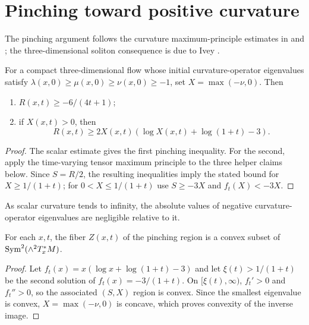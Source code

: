 \section{Pinching toward positive curvature}
The pinching argument follows the curvature maximum-principle estimates in
\cite{HamiltonNSRF3M} and \cite{HamiltonNSRF3M}; the three-dimensional soliton consequence is due to
Ivey \cite{Ivey}.
\begin{theorem}
\label{thm:pinching-toward-positive-curvature}
\label{pinch}
For a compact three-dimensional flow whose initial curvature-operator
eigenvalues satisfy $\lambda(x,0)\ge\mu(x,0)\ge\nu(x,0)\ge-1$, set
$X=\max(-\nu,0)$. Then
\begin{enumerate}
\item $R(x,t)\ge-6/(4t+1)$;
\item if $X(x,t)>0$, then
\[
R(x,t)\ge2X(x,t)(\log X(x,t)+\log(1+t)-3).
\]
\end{enumerate}
\end{theorem}
\begin{proof}
\sketch The scalar estimate gives the first pinching inequality. For the
second, apply the time-varying tensor maximum principle to the three helper
claims below. Since $S=R/2$, the resulting inequalities imply the stated bound
for $X\ge1/(1+t)$; for $0<X\le1/(1+t)$ use $S\ge-3X$ and
$f_t(X)<-3X$.
\end{proof}
\begin{remark}
\label{rem:pinching-negative-eigenvalues-small}

As scalar curvature tends to infinity, the absolute values of negative
curvature-operator eigenvalues are negligible relative to it.
\end{remark}

\begin{claim}
\label{claim:pinching-region-convex}
For each $x,t$, the fiber $Z(x,t)$ of the pinching region is a convex subset
of $\operatorname{Sym}^2(\wedge^2T_x^*M)$.
\end{claim}
\begin{proof}
\sketch Let $f_t(x)=x(\log x+\log(1+t)-3)$ and let $\xi(t)>1/(1+t)$ be the
second solution of $f_t(x)=-3/(1+t)$. On $[\xi(t),\infty)$, $f_t'>0$
and $f_t''>0$, so the associated $(S,X)$ region is convex. Since the
smallest eigenvalue is convex, $X=\max(-\nu,0)$ is concave, which proves
convexity of the inverse image.
\end{proof}

